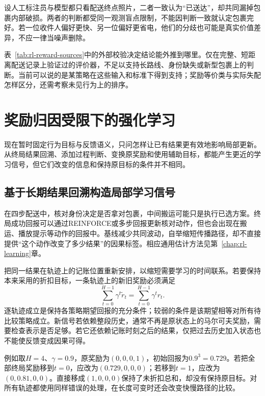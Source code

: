 设人工标注员与模型都只看配送终点照片，二者一致认为“已送达”，却共同漏掉包裹内部破损。两者的判断都受同一观测盲点限制，不能因判断一致就认定包裹完好。若一位收件人偏好更快、另一位偏好更省电，他们的分歧也可能是真实价值差异，不应一律当噪声删除。

表~\ref{tab:rl-reward-sources}中的外部校验决定结论能外推到哪里。仅在完整、短距离配送记录上验证过的评价器，不足以支持长路线、身份缺失或新型包裹上的判断。当前可以说的是某策略在这些输入和标准下得到支持；奖励等价类与实际失配怎样区分，还需考察未见行为上的排序。

\section{奖励归因受限下的强化学习}
\label{sec:rl-reward-credit}

现在暂时固定行为目标与反馈语义，只问怎样让已有结果更有效地影响局部更新。从终局结果回溯、添加过程判断、变换原奖励和使用辅助目标，都能产生更近的学习信号，但它们改变的信息和保持原目标的条件并不相同。

\subsection{基于长期结果回溯构造局部学习信号}
\label{sec:rl-reward-redistribution}

在四步配送中，核对身份决定是否拿对包裹，中间搬运可能只是执行已选方案。终局成功回报可以通过REINFORCE或多步回报更新核对动作，但也会出现在搬运、播放提示等动作的回报中。基线减少共同波动，自举缩短传播路径，却不直接提供“这个动作改变了多少结果”的因果标签。相应通用估计方法见第~\ref{chap:rl-learning}章。

把同一结果在轨迹上的记账位置重新安排，以缩短需要学习的时间联系。若要保持本来采用的折扣目标，一条轨迹上的新旧奖励必须满足
\begin{equation}
  \sum_{t=0}^{H-1}\gamma^t\widetilde r_t
    =\sum_{t=0}^{H-1}\gamma^t r_t.
  \label{eq:rl-reward-redistribution}
\end{equation}
逐轨迹成立是保持各策略期望回报的充分条件；较弱的条件是该期望相等对所有待比较策略成立。新信号若依赖整段历史，通常不再是原状态上的马尔可夫奖励，需要检查表示是否足够。若它还依赖记账时刻之后的结果，仅把过去历史加入状态也不能使反馈变成因果可得。

例如取$H=4$、$\gamma=0.9$，原奖励为$(0,0,0,1)$，初始回报为$0.9^3=0.729$。若把全部终局奖励移到$t=0$，应改为$(0.729,0,0,0)$；若移到$t=1$，应改为$(0,0.81,0,0)$。直接移成$(1,0,0,0)$保持了未折扣总和，却没有保持原目标。对所有轨迹都使用同样错误的处理，在长度可变时还会改变快慢路径的比较。

